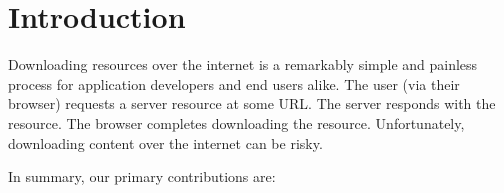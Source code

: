 \section{Introduction} \label{sec:introduction}

Downloading resources over the internet is a remarkably simple and painless
process for application developers and end users alike. The user (via their
browser) requests a server resource at some URL. The server responds with the
resource. The browser completes downloading the resource. Unfortunately,
downloading content over the internet can be risky.



In summary, our primary contributions are:


